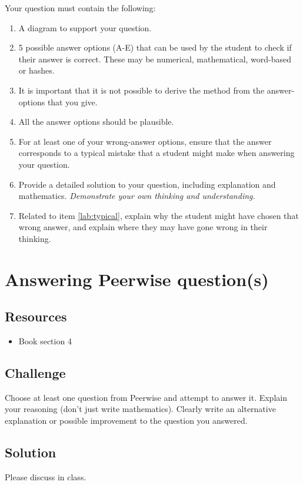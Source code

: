 Your question must contain the following:
\begin{enumerate}
    \item A diagram to support your question.
    \item 5 possible answer options (A-E) that can be used by the student to check if their answer is correct. These may be numerical, mathematical, word-based or hashes.
    \item It is important that it is not possible to derive the method from the answer-options that you give.
    \item All the answer options should be plausible.
    \item For at least one of your wrong-answer options, ensure that the answer corresponds to a typical mistake that a student might make when answering your question. \label{lab:typical}
    \item Provide a detailed solution to your question, including explanation and mathematics. \emph{Demonstrate your own thinking and understanding.}
    \item Related to item \ref{lab:typical}, explain why the student might have chosen that wrong answer, and explain where they may have gone wrong in their thinking.
\end{enumerate}




\newpage
\section{Answering Peerwise question(s)}

\subsection*{Resources}
\begin{itemize}
    \item Book section 4
\end{itemize}

\subsection*{Challenge}
Choose at least one question from Peerwise and attempt to answer it.
Explain your reasoning (don't just write mathematics).
Clearly write an alternative explanation or possible improvement to the question you answered.

\subsection*{Solution}
Please discuss in class.
